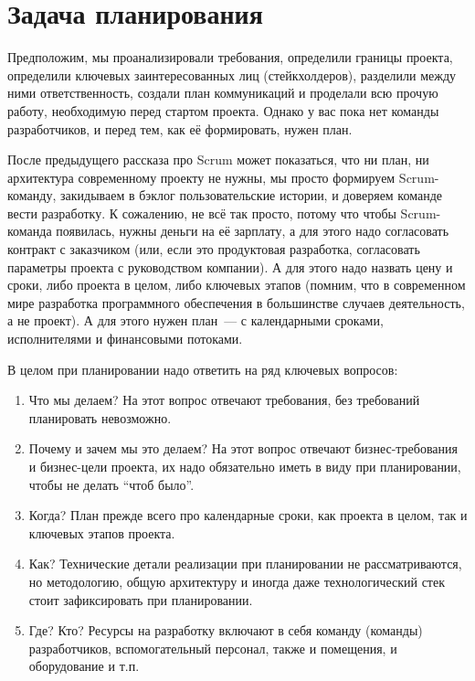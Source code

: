 \documentclass{../../text-style}
\begin{document}
\maketitle
\thispagestyle{empty}


\section{Задача планирования}

Предположим, мы проанализировали требования, определили границы проекта, определили ключевых заинтересованных лиц (стейкхолдеров), разделили между ними ответственность, создали план коммуникаций и проделали всю прочую работу, необходимую перед стартом проекта. Однако у вас пока нет команды разработчиков, и перед тем, как её формировать, нужен план.

После предыдущего рассказа про Scrum может показаться, что ни план, ни архитектура современному проекту не нужны, мы просто формируем Scrum-команду, закидываем в бэклог пользовательские истории, и доверяем команде вести разработку. К сожалению, не всё так просто, потому что чтобы Scrum-команда появилась, нужны деньги на её зарплату, а для этого надо согласовать контракт с заказчиком (или, если это продуктовая разработка, согласовать параметры проекта с руководством компании). А для этого надо назвать цену и сроки, либо проекта в целом, либо ключевых этапов (помним, что в современном мире разработка программного обеспечения в большинстве случаев деятельность, а не проект). А для этого нужен план~--- с календарными сроками, исполнителями и финансовыми потоками.

В целом при планировании надо ответить на ряд ключевых вопросов:

\begin{enumerate}
    \item Что мы делаем? На этот вопрос отвечают требования, без требований планировать невозможно.
    \item Почему и зачем мы это делаем? На этот вопрос отвечают бизнес-требования и бизнес-цели проекта, их надо обязательно иметь в виду при планировании, чтобы не делать \enquote{чтоб было}.
    \item Когда? План прежде всего про календарные сроки, как проекта в целом, так и ключевых этапов проекта.
    \item Как? Технические детали реализации при планировании не рассматриваются, но методологию, общую архитектуру и иногда даже технологический стек стоит зафиксировать при планировании.
    \item Где? Кто? Ресурсы на разработку включают в себя команду (команды) разработчиков, вспомогательный персонал, также и помещения, и оборудование и т.п.
\end{enumerate}
\end{document}
